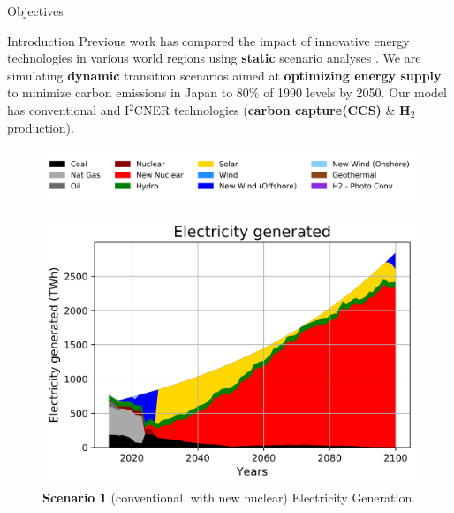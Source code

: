 \documentclass[final]{beamer}
\newlength{\onecolwid}
\newlength{\twocolwid}
\newlength{\threecolwid}
\begin{document}
\begin{frame}[t]
\begin{columns}[t,totalwidth=\threecolwid]
\begin{column}{\twocolwid}
\begin{columns}[t,totalwidth=\twocolwid]
\begin{column}{\onecolwid}
\begin{alertblock}{Objectives}
\end{alertblock}
%
%


\begin{block}{Introduction}
Previous work has compared the impact of innovative energy technologies in 
various world regions using \textbf{static} scenario analyses 
\cite{kikuchi_simulation-based_2017,pambudi_impact_2017}.  
We are simulating \textbf{dynamic} transition scenarios 
\cite{pfenninger_energy_2014} aimed at \textbf{optimizing energy supply} to minimize carbon 
emissions in Japan to 80\% of 1990 levels by 2050.
Our model has conventional and I$^2$CNER technologies (\textbf{carbon capture(CCS)} \& \textbf{H$_2$} production).
\end{block}


\begin{figure}[H] 
\centering
\includegraphics[scale=1.1]{legend}
\label{legend}
\end{figure}

\begin{figure}[H] 
\centering
\includegraphics[scale=1.51]{conv_nuc_elc}
\caption{\textbf{Scenario 1} (conventional, with new nuclear) Electricity Generation.}
\label{s1e}
\end{figure}


\end{column}
\end{columns}
\end{column}
\end{columns}
\end{frame}
\end{document}
